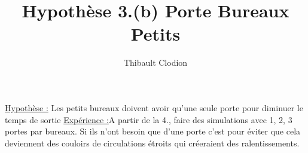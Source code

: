 \documentclass[12pt]{article}
\title{Hypothèse 3.(b) Porte Bureaux Petits}
\author{Thibault Clodion}
\begin{document}
\maketitle %

\underline{Hypothèse :} Les petits bureaux doivent avoir qu'une seule porte pour diminuer le temps de sortie
\newline\newline
\underline{Expérience :}A partir de la 4., faire des simulations avec 1, 2, 3 portes par bureaux.
\newline
Si ils n'ont besoin que d'une porte c'est pour éviter que cela deviennent des couloirs de circulations étroits qui créeraient des ralentissements.
\newline\newline
\end{document}

